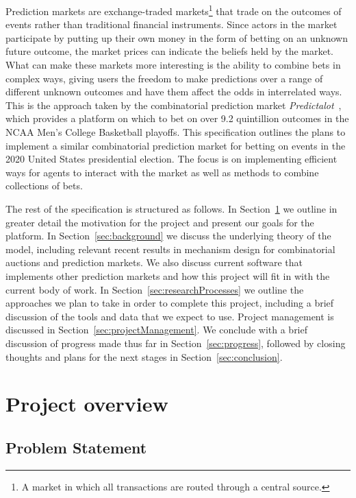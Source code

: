 \documentclass[10pt,a4paper]{article}
\theoremstyle{plain}
\theoremstyle{definition}
\begin{document}
	Prediction markets are exchange-traded markets\footnote{A market in which
	all transactions are routed through a central source.} that trade on the
	outcomes of events rather than traditional financial instruments. Since
	actors in the market participate by putting up their own money in the form
	of betting on an unknown future outcome, the market prices can indicate the
	beliefs held by the market. What can make these markets more interesting is
	the ability to combine bets in complex ways, giving users the freedom to
	make predictions over a range of different unknown outcomes and have them
	affect the odds in interrelated ways. This is the approach taken by the
	combinatorial prediction market \emph{Predictalot}~\cite{Predictalot},
	which provides a platform on which to bet on over 9.2 quintillion outcomes
	in the NCAA Men's College Basketball playoffs. This specification outlines
	the plans to implement a similar combinatorial prediction market for
	betting on events in the 2020 United States presidential election. The
	focus is on implementing efficient ways for agents to interact with the
	market as well as methods to combine collections of bets.

	The rest of the specification is structured as follows. In
	Section~\ref{sec:overview} we outline in greater detail the motivation for
	the project and present our goals for the platform. In
	Section~\ref{sec:background} we discuss the underlying theory of the model,
	including relevant recent results in mechanism design for combinatorial
	auctions and prediction markets. We also discuss current software that
	implements other prediction markets and how this project will fit in with
	the current body of work. In Section~\ref{sec:researchProcesses} we outline
	the approaches we plan to take in order to complete this project, including
	a brief discussion of the tools and data that we expect to use. Project
	management is discussed in Section~\ref{sec:projectManagement}. We conclude
	with a brief discussion of progress made thus far in
	Section~\ref{sec:progress}, followed by closing thoughts and plans for the
	next stages in Section~\ref{sec:conclusion}.

\section{Project overview}
	\label{sec:overview}

	\subsection{Problem Statement}
\end{document}
